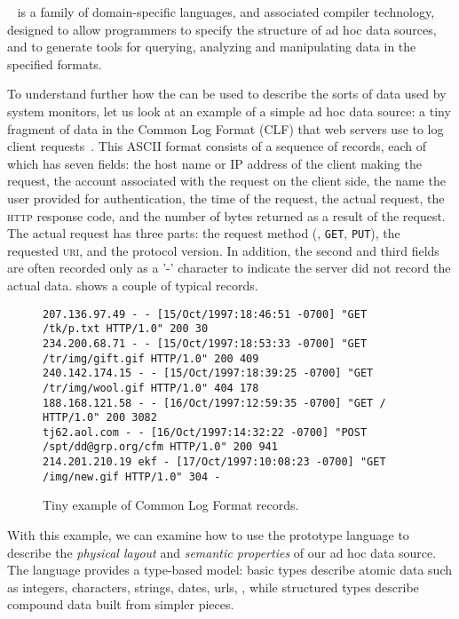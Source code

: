 \documentclass{sigplanconf}
\begin{document}
\pads{}~\cite{fisher+:pads,launchpads,fisher+:700,mandelbaum+:padsml} is 
a family of domain-specific languages, and associated compiler technology, 
designed to allow programmers to specify the structure of ad hoc data sources, 
and to generate tools for querying, analyzing and manipulating data in the specified formats.

To understand further how the \pads{} can be used to 
describe the sorts of data used by system monitors,
let us look at an example of a simple ad hoc data source:
a tiny fragment of data in the Common Log Format (CLF) that web
servers use to log client requests~\cite{wpp}.  
This ASCII format consists of a sequence of
records, each of which has seven fields: the host name or IP address
of the client making the request, the account associated with the
request on the client side, the name the user provided for
authentication, the time of the request, the actual request, the
\textsc{http} response code, and the number of bytes returned as a
result of the request.  The actual request has three parts: the
request method (\eg, \texttt{GET}, \texttt{PUT}), the requested
\textsc{uri}, and the protocol version.  In addition, the second and
third fields are often recorded only as a '-' character to indicate
the server did not record the actual data.  
shows a couple of typical records.

\begin{figure*}
\begin{footnotesize}
\begin{verbatim}
207.136.97.49 - - [15/Oct/1997:18:46:51 -0700] "GET /tk/p.txt HTTP/1.0" 200 30
234.200.68.71 - - [15/Oct/1997:18:53:33 -0700] "GET /tr/img/gift.gif HTTP/1.0" 200 409
240.142.174.15 - - [15/Oct/1997:18:39:25 -0700] "GET /tr/img/wool.gif HTTP/1.0" 404 178
188.168.121.58 - - [16/Oct/1997:12:59:35 -0700] "GET / HTTP/1.0" 200 3082
tj62.aol.com - - [16/Oct/1997:14:32:22 -0700] "POST /spt/dd@grp.org/cfm HTTP/1.0" 200 941
214.201.210.19 ekf - [17/Oct/1997:10:08:23 -0700] "GET /img/new.gif HTTP/1.0" 304 -
\end{verbatim}
\caption{Tiny example of Common Log Format records. }
\label{figure:clf-records}
\end{footnotesize}
\end{figure*}

With this example, we can examine how to use the prototype 
\pads{} language to describe 
the {\em physical layout} and 
{\em semantic properties} of our ad hoc data source. 
The language provides a type-based model:
basic types describe atomic data such as integers, characters, 
strings, dates, urls, \etc, while
structured types describe compound data built from simpler pieces.
\end{document}
